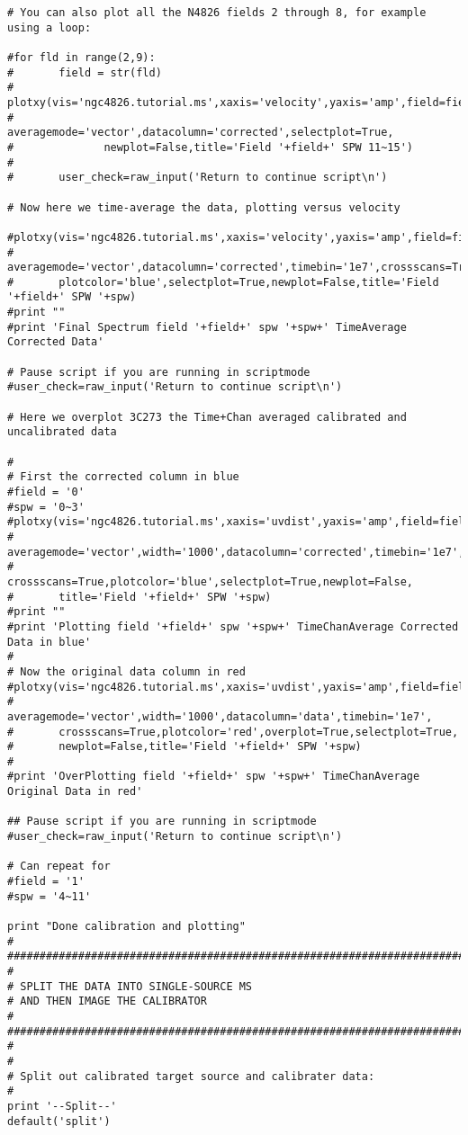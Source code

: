 \begin{verbatim}
# You can also plot all the N4826 fields 2 through 8, for example using a loop:

#for fld in range(2,9):
#       field = str(fld)
#       plotxy(vis='ngc4826.tutorial.ms',xaxis='velocity',yaxis='amp',field=field,spw='11~15',
#              averagemode='vector',datacolumn='corrected',selectplot=True,
#              newplot=False,title='Field '+field+' SPW 11~15')
#       
#       user_check=raw_input('Return to continue script\n')

# Now here we time-average the data, plotting versus velocity

#plotxy(vis='ngc4826.tutorial.ms',xaxis='velocity',yaxis='amp',field=field,spw=spw,
#       averagemode='vector',datacolumn='corrected',timebin='1e7',crossscans=True,
#       plotcolor='blue',selectplot=True,newplot=False,title='Field '+field+' SPW '+spw)
#print ""
#print 'Final Spectrum field '+field+' spw '+spw+' TimeAverage Corrected Data'
        
# Pause script if you are running in scriptmode
#user_check=raw_input('Return to continue script\n')

# Here we overplot 3C273 the Time+Chan averaged calibrated and uncalibrated data

#
# First the corrected column in blue
#field = '0'
#spw = '0~3'
#plotxy(vis='ngc4826.tutorial.ms',xaxis='uvdist',yaxis='amp',field=field,spw=spw,
#       averagemode='vector',width='1000',datacolumn='corrected',timebin='1e7',
#       crossscans=True,plotcolor='blue',selectplot=True,newplot=False,
#       title='Field '+field+' SPW '+spw)
#print ""
#print 'Plotting field '+field+' spw '+spw+' TimeChanAverage Corrected Data in blue'
#
# Now the original data column in red
#plotxy(vis='ngc4826.tutorial.ms',xaxis='uvdist',yaxis='amp',field=field,spw=spw,
#       averagemode='vector',width='1000',datacolumn='data',timebin='1e7',
#       crossscans=True,plotcolor='red',overplot=True,selectplot=True,
#       newplot=False,title='Field '+field+' SPW '+spw)
#
#print 'OverPlotting field '+field+' spw '+spw+' TimeChanAverage Original Data in red'
        
## Pause script if you are running in scriptmode
#user_check=raw_input('Return to continue script\n')

# Can repeat for
#field = '1'
#spw = '4~11'

print "Done calibration and plotting"
#
##########################################################################
#
# SPLIT THE DATA INTO SINGLE-SOURCE MS
# AND THEN IMAGE THE CALIBRATOR
#
##########################################################################
#
#
# Split out calibrated target source and calibrater data:
#
print '--Split--'
default('split')


\end{verbatim}
